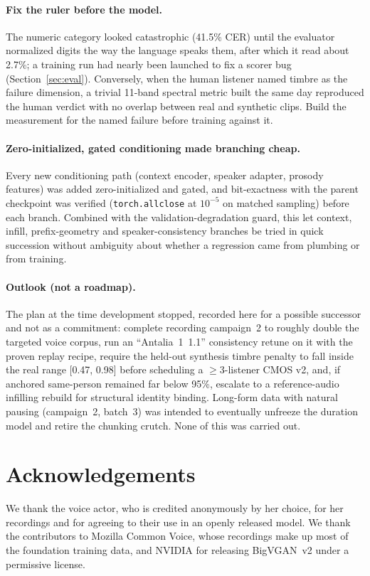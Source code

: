 \documentclass[10pt,twocolumn]{article}
\newcommand{\antalia}{Antalia~1}
\newcommand{\code}[1]{\texttt{#1}}
\begin{document}
\paragraph{Fix the ruler before the model.} The numeric category looked catastrophic (41.5\% CER) until the evaluator normalized digits the way the language speaks them, after which it read about 2.7\%; a training run had nearly been launched to fix a scorer bug (Section~\ref{sec:eval}). Conversely, when the human listener named timbre as the failure dimension, a trivial 11-band spectral metric built the same day reproduced the human verdict with no overlap between real and synthetic clips. Build the measurement for the named failure before training against it.

\paragraph{Zero-initialized, gated conditioning made branching cheap.} Every new conditioning path (context encoder, speaker adapter, prosody features) was added zero-initialized and gated, and bit-exactness with the parent checkpoint was verified (\code{torch.allclose} at $10^{-5}$ on matched sampling) before each branch. Combined with the validation-degradation guard, this let context, infill, prefix-geometry and speaker-consistency branches be tried in quick succession without ambiguity about whether a regression came from plumbing or from training.

\paragraph{Outlook (not a roadmap).} The plan at the time development stopped, recorded here for a possible successor and not as a commitment: complete recording campaign~2 to roughly double the targeted voice corpus, run an ``\antalia~1.1'' consistency retune on it with the proven replay recipe, require the held-out synthesis timbre penalty to fall inside the real range [0.47, 0.98] before scheduling a $\ge$3-listener CMOS v2, and, if anchored same-person remained far below 95\%, escalate to a reference-audio infilling rebuild for structural identity binding. Long-form data with natural pausing (campaign~2, batch~3) was intended to eventually unfreeze the duration model and retire the chunking crutch. None of this was carried out.

\section*{Acknowledgements}

We thank the voice actor, who is credited anonymously by her choice, for her recordings and for agreeing to their use in an openly released model. We thank the contributors to Mozilla Common Voice, whose recordings make up most of the foundation training data, and NVIDIA for releasing BigVGAN~v2 under a permissive license.



\end{document}
